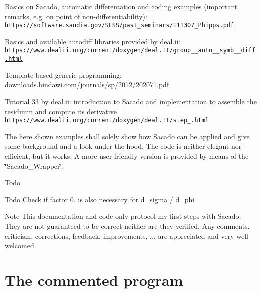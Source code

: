 \begin{DoxyItemize}
\item Basics on Sacado, automatic differentation and coding examples (important remarks, e.\+g. on point of non-\/differentiability)\+: ~\newline
 \href{https://software.sandia.gov/SESS/past_seminars/111307_Phipps.pdf}{\tt https\+://software.\+sandia.\+gov/\+S\+E\+S\+S/past\+\_\+seminars/111307\+\_\+\+Phipps.\+pdf}
\item Basics and available autodiff libraries provided by deal.\+ii\+: ~\newline
 \href{https://www.dealii.org/current/doxygen/deal.II/group__auto__symb__diff.html}{\tt https\+://www.\+dealii.\+org/current/doxygen/deal.\+I\+I/group\+\_\+\+\_\+auto\+\_\+\+\_\+symb\+\_\+\+\_\+diff.\+html}
\item Template-\/based generic programming\+: ~\newline
 downloads.\+hindawi.\+com/journals/sp/2012/202071.pdf
\item Tutorial 33 by deal.\+ii\+: introduction to Sacado and implementation to assemble the residuum and compute its derivative ~\newline
 \href{https://www.dealii.org/current/doxygen/deal.II/step_33.html}{\tt https\+://www.\+dealii.\+org/current/doxygen/deal.\+I\+I/step\+\_.\+html}
\end{DoxyItemize}

The here shown examples shall solely show how Sacado can be applied and give some background and a look under the hood. The code is neither elegant nor efficient, but it works. A more user-\/friendly version is provided by means of the \char`\"{}\+Sacado\+\_\+\+Wrapper\char`\"{}. ~\newline
\begin{DoxyRefDesc}{Todo}
\item[\hyperlink{todo__todo000003}{Todo}]Check if factor 0. is also necessary for d\+\_\+sigma / d\+\_\+phi\end{DoxyRefDesc}


\begin{DoxyNote}{Note}
This documentation and code only protocol my first steps with Sacado. They are not guaranteed to be correct neither are they verified. Any comments, criticism, corrections, feedback, improvements, ... are appreciated and very well welcomed.
\end{DoxyNote}
\hypertarget{index_code}{}\section{The commented program}\label{index_code}

